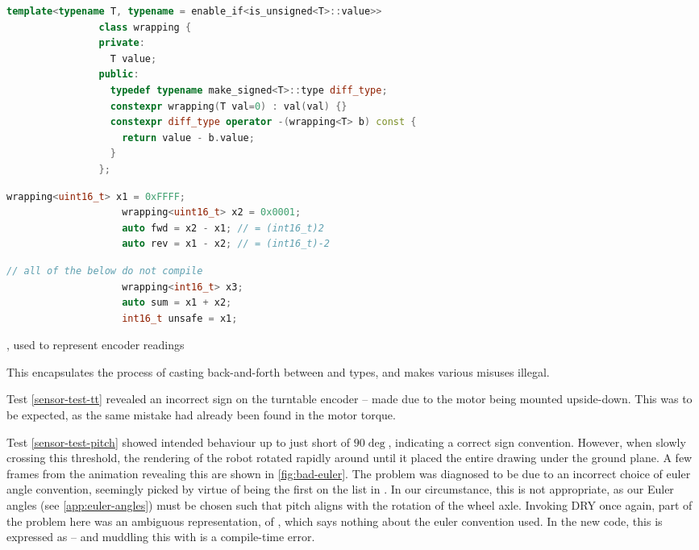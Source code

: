 \documentclass[main.tex]{subfiles}
\begin{document}
		\begin{listingfloat}
			\begin{lstlisting}[language=c++,frame=single,gobble=8]
				template<typename T, typename = enable_if<is_unsigned<T>::value>>
				class wrapping {
				private:
				  T value;
				public:
				  typedef typename make_signed<T>::type diff_type;
				  constexpr wrapping(T val=0) : val(val) {}
				  constexpr diff_type operator -(wrapping<T> b) const {
				    return value - b.value;
				  }
				};
			\end{lstlisting}%
			\begin{minipage}[t]{0.5\linewidth-1em}
				\begin{lstlisting}[language=c++,frame=single,gobble=10]
					wrapping<uint16_t> x1 = 0xFFFF;
					wrapping<uint16_t> x2 = 0x0001;
					auto fwd = x2 - x1; // = (int16_t)2
					auto rev = x1 - x2; // = (int16_t)-2
				\end{lstlisting}
			\end{minipage}\hfill
			\begin{minipage}[t]{0.5\linewidth-1em}
				\begin{lstlisting}[language=c++,frame=single,gobble=10]
					// all of the below do not compile
					wrapping<int16_t> x3;
					auto sum = x1 + x2;
					int16_t unsafe = x1;
				\end{lstlisting}
			\end{minipage}\hfill
			\caption{, used to represent encoder readings}
			\label{listing:wrapping}
			\medskip
			\small
			This encapsulates the process of casting back-and-forth between  and  types, and makes various misuses illegal.
		\end{listingfloat}

		Test \ref{sensor-test-tt} revealed an incorrect sign on the turntable encoder -- made due to the motor being mounted upside-down.
		This was to be expected, as the same mistake had already been found in the motor torque.

		Test \ref{sensor-test-pitch} showed intended behaviour up to just short of $90\deg$, indicating a correct sign convention.
		However, when slowly crossing this threshold, the rendering of the robot rotated rapidly around until it placed the entire drawing under the ground plane.
		A few frames from the animation revealing this are shown in \cref{fig:bad-euler}.
		The problem was diagnosed to be due to an incorrect choice of euler angle convention, seemingly picked by virtue of being the first on the list in \cite{diebel2006representing}.
		In our circumstance, this is not appropriate, as our Euler angles (see \cref{app:euler-angles}) must be chosen such that pitch aligns with the rotation of the wheel axle.
		Invoking DRY once again, part of the problem here was an ambiguous representation, of , which says nothing about the euler convention used.
		In the new code, this is expressed as  -- and muddling this with  is a compile-time error.
\end{document}
